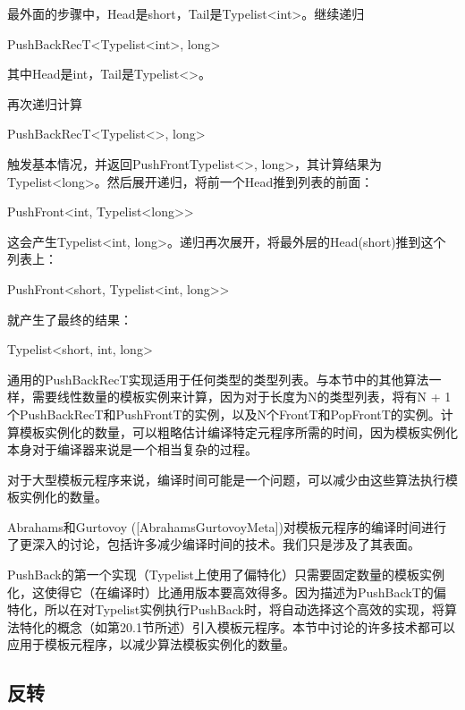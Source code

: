 最外面的步骤中，Head是short，Tail是Typelist<int>。继续递归

\begin{cpp}
PushBackRecT<Typelist<int>, long>
\end{cpp}

其中Head是int，Tail是Typelist<>。

再次递归计算

\begin{cpp}
PushBackRecT<Typelist<>, long>
\end{cpp}

触发基本情况，并返回PushFrontTypelist<>, long>，其计算结果为Typelist<long>。然后展开递归，将前一个Head推到列表的前面：

\begin{cpp}
PushFront<int, Typelist<long>>
\end{cpp}

这会产生Typelist<int, long>。递归再次展开，将最外层的Head(short)推到这个列表上：

\begin{cpp}
PushFront<short, Typelist<int, long>>
\end{cpp}

就产生了最终的结果：

\begin{cpp}
Typelist<short, int, long>
\end{cpp}

通用的PushBackRecT实现适用于任何类型的类型列表。与本节中的其他算法一样，需要线性数量的模板实例来计算，因为对于长度为N的类型列表，将有N + 1个PushBackRecT和PushFrontT的实例，以及N个FrontT和PopFrontT的实例。计算模板实例化的数量，可以粗略估计编译特定元程序所需的时间，因为模板实例化本身对于编译器来说是一个相当复杂的过程。

对于大型模板元程序来说，编译时间可能是一个问题，可以减少由这些算法执行模板实例化的数量。

\begin{notice}
Abrahams和Gurtovoy ([AbrahamsGurtovoyMeta])对模板元程序的编译时间进行了更深入的讨论，包括许多减少编译时间的技术。我们只是涉及了其表面。
\end{notice}

PushBack的第一个实现（Typelist上使用了偏特化）只需要固定数量的模板实例化，这使得它（在编译时）比通用版本要高效得多。因为描述为PushBackT的偏特化，所以在对Typelist实例执行PushBack时，将自动选择这个高效的实现，将算法特化的概念（如第20.1节所述）引入模板元程序。本节中讨论的许多技术都可以应用于模板元程序，以减少算法模板实例化的数量。

\subsection{反转}

